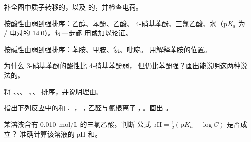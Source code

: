 \begin{exercise}[$\star$]\label{exo:b1:electronic-effects:4}
补全图中质子转移的，以及
 的，并检查电荷。
\end{exercise}

\begin{exercise}[$\star\star$]\label{exo:b1:electronic-effects:5}
按酸性由弱到强排序：乙醇、苯酚、乙酸、
4-硝基苯酚、三氯乙酸、水（$\mathrm{p}K_a$ 为
/ 电对的 14.0）。每一步都
用或加以论证。
\end{exercise}

\begin{exercise}[$\star\star$]\label{exo:b1:electronic-effects:6}
按碱性由弱到强排序：苯胺、甲胺、氨、吡啶。
用解释苯胺的位置。
\end{exercise}

\begin{exercise}[$\star\star$]\label{exo:b1:electronic-effects:7}
为什么 3-硝基苯酚的酸性比 4-硝基苯酚弱，
但仍比苯酚强？画出能说明这两种说法的。
\end{exercise}

\begin{exercise}[$\star\star$]\label{exo:b1:electronic-effects:8}
将 、、、
、、 排序，并说明理由。
\end{exercise}

\begin{exercise}[$\star\star$]\label{exo:b1:electronic-effects:9}
指出下列反应中的和：；
；乙醛与氰根离子；。画出
。
\end{exercise}

\begin{exercise}[$\star\star\star$]\label{exo:b1:electronic-effects:10}
某溶液含有 \qty{0.010}{mol/L} 的三氯乙酸。判断
公式 $\mathrm{pH} = \frac12(\mathrm{p}K_a - \log C)$ 是否成立？
准确计算该溶液的 pH 和。
\end{exercise}


